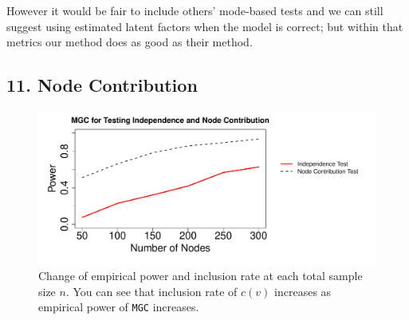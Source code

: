 \documentclass[12pt]{article}
\begin{document}
However it would be fair to include others' mode-based tests and we can still suggest using estimated latent factors when the model is correct; but within that metrics our method does as good as their method. 

\subsection*{11. Node Contribution}


\begin{figure}[H]
	\centering
	\includegraphics[width=6in]{../Figure/nodecontri.pdf}
	\caption{Change of empirical power and inclusion rate at each total sample size $n$. You can see that inclusion rate of $c(v)$ increases as empirical power of \texttt{MGC} increases.}
	\label{fig:contribution}
\end{figure}
\end{document}
